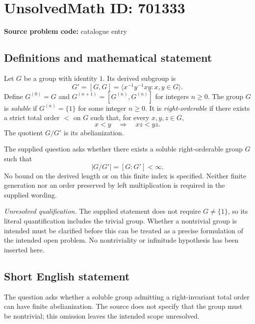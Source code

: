 \documentclass[11pt]{article}
\begin{document}
\section*{UnsolvedMath ID: 701333}
\textbf{Source problem code:} catalogue entry
\subsection{Definitions and mathematical statement}
Let \(G\) be a group with identity \(1\). Its derived subgroup is
\[
G'=[G,G]=\langle x^{-1}y^{-1}xy:x,y\in G\rangle.
\]
Define \(G^{(0)}=G\) and \(G^{(n+1)}=[G^{(n)},G^{(n)}]\) for integers \(n\geq 0\). The group \(G\) is \emph{soluble} if \(G^{(n)}=\{1\}\) for some integer \(n\geq 0\). It is \emph{right-orderable} if there exists a strict total order \(<\) on \(G\) such that, for every \(x,y,z\in G\),
\[
x<y\quad\Longrightarrow\quad xz<yz.
\]
The quotient \(G/G'\) is its abelianization.

The supplied question asks whether there exists a soluble right-orderable group \(G\) such that
\[
|G/G'|=[G:G']<\infty.
\]
No bound on the derived length or on this finite index is specified. Neither finite generation nor an order preserved by left multiplication is required in the supplied wording.

\emph{Unresolved qualification.} The supplied statement does not require \(G\neq\{1\}\), so its literal quantification includes the trivial group. Whether a nontrivial group is intended must be clarified before this can be treated as a precise formulation of the intended open problem. No nontriviality or infinitude hypothesis has been inserted here.
\subsection{Short English statement}
The question asks whether a soluble group admitting a right-invariant total order can have finite abelianization. The source does not specify that the group must be nontrivial; this omission leaves the intended scope unresolved.
\end{document}
